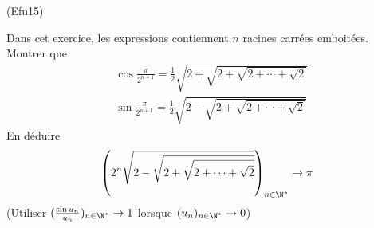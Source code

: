 \begin{tiny}(Efu15)\end{tiny} Dans cet exercice, les expressions contiennent $n$ racines carrées emboitées. Montrer que 
\begin{align*}
 &\cos \frac{\pi}{2^{n+1}} =\frac{1}{2}\sqrt{2+\sqrt{2+\sqrt{2+\cdots +\sqrt{2}}}}\\
 &\sin \frac{\pi}{2^{n+1}} =\frac{1}{2}\sqrt{2-\sqrt{2+\sqrt{2+\cdots +\sqrt{2}}}}
\end{align*}
En déduire
\begin{displaymath}
 \left(2^n \sqrt{2-\sqrt{2+\sqrt{2+\cdots +\sqrt{2}}}} \right)_{n\in \N^*} \rightarrow \pi 
\end{displaymath}
(Utiliser $(\frac{\sin u_n}{u_n})_{n\in \N^*}\rightarrow 1$ lorsque $(u_n)_{n\in \N^*}\rightarrow 0$)
